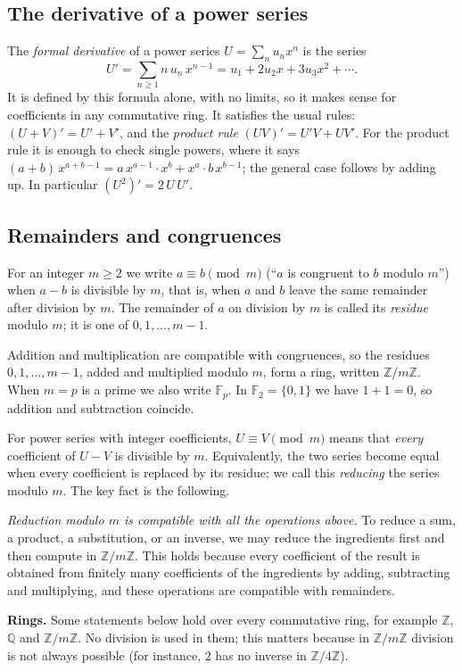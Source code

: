\documentclass[11pt,a4paper]{article}
\theoremstyle{definition}
\theoremstyle{remark}
\newcommand{\Z}{\mathbb{Z}}
\newcommand{\Q}{\mathbb{Q}}
\newcommand{\F}{\mathbb{F}}
\newcommand{\para}[1]{\par\medskip\noindent\textbf{#1}\enspace}
\begin{document}
\subsection{The derivative of a power series}
The \emph{formal derivative} of a power series $U=\sum_nu_nx^n$ is the series
\[
U'=\sum_{n\ge1}n\,u_n\,x^{n-1}=u_1+2u_2x+3u_3x^2+\cdots .
\]
It is defined by this formula alone, with no limits, so it makes sense for coefficients in any commutative ring. It
satisfies the usual rules: $(U+V)'=U'+V'$, and the \emph{product rule} $(UV)'=U'V+UV'$. For the product rule it is enough
to check single powers, where it says $(a+b)\,x^{a+b-1}=a\,x^{a-1}\cdot x^b+x^a\cdot b\,x^{b-1}$; the general case follows
by adding up. In particular $(U^2)'=2\,U\,U'$.

\subsection{Remainders and congruences}
For an integer $m\ge2$ we write $a\equiv b\pmod m$ (``$a$ is congruent to $b$ modulo $m$'') when $a-b$ is divisible by
$m$, that is, when $a$ and $b$ leave the same remainder after division by $m$. The remainder of $a$ on division by
$m$ is called its \emph{residue} modulo $m$; it is one of $0,1,\dots,m-1$.

Addition and multiplication are compatible with congruences, so the residues $0,1,\dots,m-1$, added and multiplied
modulo $m$, form a ring, written $\Z/m\Z$. When $m=p$ is a prime we also write $\F_p$. In $\F_2=\{0,1\}$ we have $1+1=0$,
so addition and subtraction coincide.

For power series with integer coefficients, $U\equiv V\pmod m$ means that \emph{every} coefficient of $U-V$ is
divisible by $m$. Equivalently, the two series become equal when every coefficient is replaced by its residue; we call
this \emph{reducing} the series modulo $m$. The key fact is the following.

\emph{Reduction modulo $m$ is compatible with all the operations above.} To reduce a sum, a product, a substitution, or
an inverse, we may reduce the ingredients first and then compute in $\Z/m\Z$. This holds because every
coefficient of the result is obtained from finitely many coefficients of the ingredients by adding, subtracting and
multiplying, and these operations are compatible with remainders.

\para{Rings.} Some statements below hold over every commutative ring, for example $\Z$, $\Q$ and $\Z/m\Z$. No
division is used in them; this matters because in $\Z/m\Z$ division is not always possible (for instance, $2$ has no inverse in
$\Z/4\Z$).
\end{document}
